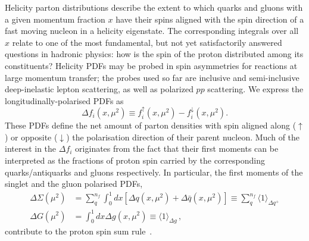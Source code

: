 Helicity parton distributions describe the extent to which quarks and gluons 
with a given momentum fraction $x$ have their spins aligned with the spin 
direction of a fast moving nucleon in a helicity eigenstate. 
%
The corresponding integrals over all $x$ relate to one of the most fundamental, 
but not yet satisfactorily answered questions in hadronic physics: 
how is the spin of the proton distributed among its constituents? 
%
Helicity PDFs may be probed in spin asymmetries for reactions at large momentum 
transfer; the probes used so far are inclusive and semi-inclusive 
deep-inelastic lepton scattering, as well as polarized $pp$ scattering. We express the
longitudinally-polarised PDFs as
\begin{equation}
\Delta f_i(x,\mu^2) \equiv f_i^{\uparrow}(x,\mu^2) - f_i^{\downarrow}(x,\mu^2).
\label{eq:polPDFs}
\end{equation}
These PDFs define the net amount of parton 
densities with spin aligned along ($\uparrow$) or opposite ($\downarrow$)
the polarisation direction of their parent nucleon.
%
Much of the interest in the $\Delta f_i$ originates from the fact that their 
first moments can be interpreted as the fractions of proton spin 
carried by the corresponding quarks/antiquarks and gluons respectively. In particular,
the first moments of the singlet and the gluon polarised PDFs,
\begin{align}
\Delta\Sigma(\mu^2)
& =
\sum_{q}^{n_f}\int_0^1 dx 
\left[\Delta q(x, \mu^2) + \Delta\bar{q}(x, \mu^2)\right]
\equiv
\sum_q^{n_f}\langle 1 \rangle_{\Delta q^+}
\\
\Delta G(\mu^2)
& =
\int_0^1 dx \Delta g(x,\mu^2)
\equiv
\langle 1 \rangle_{\Delta g}
\,,
\label{eq:moments}
\end{align}
contribute to the proton spin sum rule~\cite{Leader:2013jra}.
%

